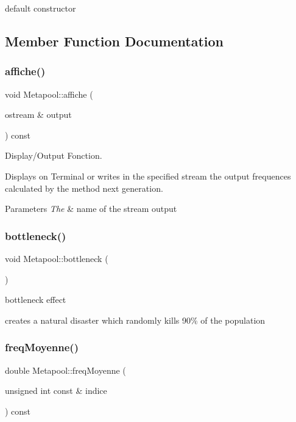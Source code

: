 default constructor 



\subsection{Member Function Documentation}
\hypertarget{class_metapool_a057829fc0c87436e1d7d5c4e14d7ef4f}{}\label{class_metapool_a057829fc0c87436e1d7d5c4e14d7ef4f} 
\subsubsection{\texorpdfstring{affiche()}{affiche()}}
{\footnotesize\ttfamily void Metapool\+::affiche (\begin{DoxyParamCaption}\item[{ostream \&}]{output }\end{DoxyParamCaption}) const}



Display/\+Output Fonction. 

Displays on Terminal or writes in the specified stream the output frequences calculated by the method next generation. 
\begin{DoxyParams}{Parameters}
{\em The} & name of the stream output \\
\hline
\end{DoxyParams}
\hypertarget{class_metapool_a54acb827f5913283577c5e1830f3bf2e}{}\label{class_metapool_a54acb827f5913283577c5e1830f3bf2e} 
\subsubsection{\texorpdfstring{bottleneck()}{bottleneck()}}
{\footnotesize\ttfamily void Metapool\+::bottleneck (\begin{DoxyParamCaption}{ }\end{DoxyParamCaption})}



bottleneck effect 

creates a natural disaster which randomly kills 90\% of the population \hypertarget{class_metapool_af391e0b9374cd19ec027437a4aa83d7f}{}\label{class_metapool_af391e0b9374cd19ec027437a4aa83d7f} 
\subsubsection{\texorpdfstring{freq\+Moyenne()}{freqMoyenne()}}
{\footnotesize\ttfamily double Metapool\+::freq\+Moyenne (\begin{DoxyParamCaption}\item[{unsigned int const \&}]{indice }\end{DoxyParamCaption}) const}



